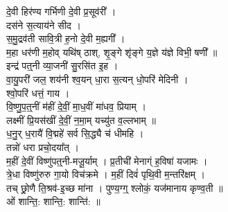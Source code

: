 दे॒वी हिर॑ण्य गर्भिणी दे॒वी प्र॒सूव॑री᳚ ।\\
दस॑ने स॒त्याय॑ने सीद ।\\
स॒मु॒द्रव॑ती सावि॒त्री ह॒नो दे॒वी म॒ह्यगी᳚ ।\\
म॒हा धर॑णी म॒होव् यथि॑ष् ठाश्, शृ॒ङ्गे शृ॑ङ्गे य॒ज्ञे य॑ज्ञे विभी॒ षणी᳚ ॥\\
इन्द्र॑ पत्॒नी व्या॒जनी॑ सु॒रसि॑त इ॒ह ।\\
वा॒यु॒परी॑ जल॒ शय॑नी {\small {}} श्व॒यन् धा॒रा स॒त्यन् धो॒परि॑ मेदिनी ।\\
श्वो॒परि॑ धत्तं॒ गाय ।\\
वि॒ष्णु॒प॒त्॒नीं म॑हीं दे॒वीं॒ मा॒ध॒वीं मा॑धव॒ प्रियाम् ।\\
लक्ष्मीं प्रि॒यस॑खीं दे॒वीं॒ न॒मा॒म् यच्यु॑त व॒ल्लभाम् ॥\\
ध॒नु॒र् ध॒रायै॑ वि॒द्महे॑ सर्व सि॒द्ध्यै च॑ धीमहि ।\\
तन्नो॑ धरा प्रचो॒दया᳚त् ।\\
म॒हीं दे॒वीं विष्णु॑पत्॒नी-मजू॒र्याम् । प्र॒तीची॑ मेनाग्ं ह॒विषा॑ यजामः ।\\
त्रे॒धा विष्णु॑रुरु गा॒यो विच॑क्रमे । म॒हीं दिवं॑ पृथि॒वी म॒न्तरि॑क्षम् ।\\
तच् छ्रो॒णै ति॒श्रव॑-इ॒च्छ मा॑ना । पुण्य॒ग्ग्॒ श्लोकं॒ यज॑मानाय कृण्व॒ती ॥\\
ओं शान्ति॒: शान्ति॒: शान्ति॑: ॥\\
